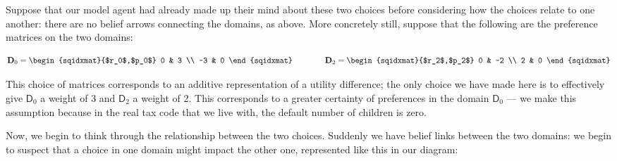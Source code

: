 \documentclass{article}
\begin{document}
	\begin{center}
	\end{center}

	Suppose that our model agent had already made up their mind about these two choices before considering how the choices relate to one another: there are no belief arrows connecting the domains, as above. More concretely still, suppose that the following are the preference matrices on the two domains:
	
	\[ \mat D_0 = \begin{sqidxmat}{$r_0$,$p_0$} 	0 & 3 \\ -3 & 0	\end{sqidxmat} 
		\qquad\qquad
		\mat D_2 =  \begin{sqidxmat}{$r_2$,$p_2$} 	0 & -2 \\ 2 & 0	\end{sqidxmat}  \]
		
	This choice of matrices corresponds to an additive representation of a utility difference; the only choice we have made here is to effectively give $\mathsf D_0$ a weight of 3 and $\mathsf D_2$ a weight of 2. This corresponds to a greater certainty of preferences in the domain $\mathsf D_0$ --- we make this assumption because in the real tax code that we live with, the default number of children is zero. 
	
	Now, we begin to think through the relationship between the two choices. Suddenly we have belief links between the two domains: we begin to suspect that a choice in one domain might impact the other one, represented like this in our diagram:
	
\end{document}
